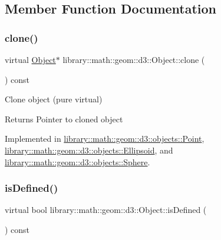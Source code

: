 \subsection{Member Function Documentation}
\mbox{\label{classlibrary_1_1math_1_1geom_1_1d3_1_1_object_a1a784c6b359e0eb97cd34fabc42f2f3f}} 
\subsubsection{\texorpdfstring{clone()}{clone()}}
{\footnotesize\ttfamily virtual \hyperlink{classlibrary_1_1math_1_1geom_1_1d3_1_1_object}{Object}$\ast$ library\+::math\+::geom\+::d3\+::\+Object\+::clone (\begin{DoxyParamCaption}{ }\end{DoxyParamCaption}) const\hspace{0.3cm}{\ttfamily [pure virtual]}}



Clone object (pure virtual) 

\begin{DoxyReturn}{Returns}
Pointer to cloned object 
\end{DoxyReturn}


Implemented in \hyperlink{classlibrary_1_1math_1_1geom_1_1d3_1_1objects_1_1_point_a32aa1e233c6ac5341605961f6bf0f210}{library\+::math\+::geom\+::d3\+::objects\+::\+Point}, \hyperlink{classlibrary_1_1math_1_1geom_1_1d3_1_1objects_1_1_ellipsoid_a8982455e000708f1b7e4caf728e7ad40}{library\+::math\+::geom\+::d3\+::objects\+::\+Ellipsoid}, and \hyperlink{classlibrary_1_1math_1_1geom_1_1d3_1_1objects_1_1_sphere_a58370a8ff15b7c5a48cf4ffec5be3015}{library\+::math\+::geom\+::d3\+::objects\+::\+Sphere}.

\mbox{\label{classlibrary_1_1math_1_1geom_1_1d3_1_1_object_a2216442e322f0c3ca5f01a4efa22baf7}} 
\subsubsection{\texorpdfstring{is\+Defined()}{isDefined()}}
{\footnotesize\ttfamily virtual bool library\+::math\+::geom\+::d3\+::\+Object\+::is\+Defined (\begin{DoxyParamCaption}{ }\end{DoxyParamCaption}) const\hspace{0.3cm}{\ttfamily [pure virtual]}}



